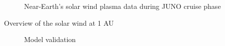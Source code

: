 \documentclass[
]{agujournal2019}
\begin{document}
\begin{figure}


\caption{\label{fig-overview}Near-Earth's solar wind plasma data during JUNO cruise phase}

\end{figure}%

Overview of the solar wind at 1 AU

{}

\begin{figure}


\caption{\label{fig-modelValidation}Model validation}

\end{figure}%
\end{document}

